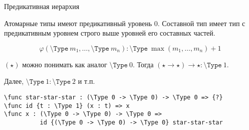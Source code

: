 \documentclass[aspectratio=169,dvipsnames,usenames]{beamer}
\begin{document}
\begin{frame}[fragile]{Предикативная иерархия}
\begin{dfn}
Атомарные типы имеют предикативный уровень 0.
Составной тип имеет тип с предикативным уровнем строго выше уровней его составных частей.

$$\varphi(\texttt{\textbackslash{}Type}\ m_1, \dots, \texttt{\textbackslash{}Type}\ m_n) : \texttt{\textbackslash{}Type}\ \max(m_1,\dots,m_n)+1$$
\end{dfn}

\begin{exm}
$(\star)$ можно понимать как аналог $\texttt{\textbackslash{}Type}\ 0$. Тогда
$(\star \rightarrow \star) \rightarrow \star : \texttt{\textbackslash{}Type}\ 1$.

Далее, $\texttt{\textbackslash{}Type}\ 1 : \texttt{\textbackslash{}Type}\ 2$ и т.п.
\end{exm}

\small\color[HTML]{025002}
\begin{verbatim}
\func star-star-star : (\Type 0 -> \Type 0) -> \Type 0 => {?}
\func id {t : \Type 1} (x : t) => x
\func x : (\Type 0 -> \Type 0) -> \Type 0 => 
          id {(\Type 0 -> \Type 0) -> \Type 0} star-star-star
\end{verbatim}
\end{frame}
\end{document}
